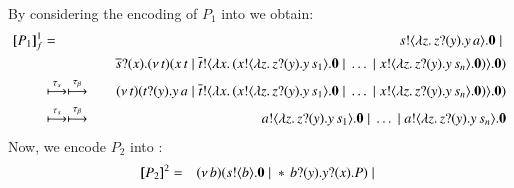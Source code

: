 \documentclass[runningheads]{llncs}
\begin{document}
{%
By considering the encoding of $P_1$ into \HO   
we obtain:
\begin{eqnarray*}
[\!\![P_1]\!\!]^{1}_f & = &  	s ! \langle \lambda z.\,z ? (y) . y\, {a} \rangle . \mathbf{0} \;|\; \\
& & \quad  \overline{s} ? (x) . (\nu\, t)(x\, {t} \;|\; \overline{t} ! \langle \lambda x.\,(x ! \langle \lambda z.\,z ? (y) . y\, {s_1} \rangle . \mathbf{0} \;|\; \dots \;|\; x ! \langle \lambda z.\,z ? (y) . y\, {s_n} \rangle . \mathbf{0}) \rangle . \mathbf{0})\\
	& \stackrel{\tau_{s}}{\longmapsto} \stackrel{\tau_{\beta}}{\longmapsto} & 
	(\nu\, t)(t ? (y) . y\, {a} \;|\; \overline{t} ! \langle \lambda x.\,(x ! \langle \lambda z.\,z ? (y) . y\, {s_1} \rangle . \mathbf{0} \;|\; \dots \;|\; x ! \langle \lambda z.\,z ? (y) . y\, {s_n} \rangle . \mathbf{0}) \rangle . \mathbf{0})\\
	& \stackrel{\tau_{s}}{\longmapsto}\stackrel{\tau_{\beta}}{\longmapsto}  & 
	a ! \langle \lambda z.\,z ? (y) . y\, {s_1} \rangle . \mathbf{0} \;|\; \dots \;|\; a ! \langle \lambda z.\,z ? (y) . y\, {s_n} \rangle . \mathbf{0}
\end{eqnarray*}
Now, we encode $P_2$ into \sessp:
\begin{eqnarray*}
\pmap{P_2}{2} & = & 	\newsp{b}{\bout{s}{b} \inact \Par \repl \binp{b}{y} \binp{y}{x} P} \Par \\

\end{eqnarray*}}
\end{document}

